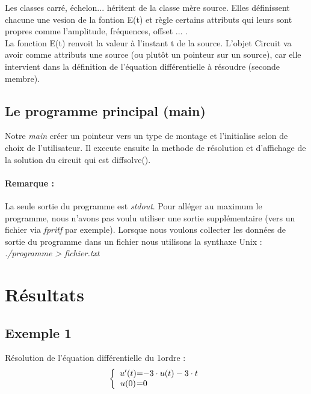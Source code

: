 \documentclass[a4paper,11pt]{article}
\begin{document}
Les classes carré, échelon... héritent de la classe mère source. Elles définissent chacune une vesion de la fontion E(t) et règle certains
attributs qui leurs sont propres comme l'amplitude, fréquences, offset ... .\\
La fonction E(t) renvoit la valeur à l'instant t de la source. L'objet Circuit va avoir comme attributs une source (ou plutôt un pointeur sur un source), 
car elle intervient dans la définition de l'équation différentielle à résoudre (seconde membre).

\subsection{Le programme principal (main)}
Notre \textit{main} créer un pointeur vers un type de montage et l'initialise selon de choix de l'utilisateur.
Il execute ensuite la methode de résolution et d'affichage de la solution du circuit qui est diffsolve().

\paragraph{Remarque : }La seule sortie du programme est \textit{stdout}. Pour alléger au maximum le programme, nous n'avons pas voulu 
utiliser une sortie supplémentaire (vers un fichier via \textit{fpritf} par exemple). Lorsque nous voulons collecter les données de sortie 
du programme dans un fichier nous utilisons la synthaxe Unix : \textit{./programme > fichier.txt}

\newpage

\section{Résultats}
  \subsection{Exemple 1}
Résolution de l'équation différentielle du 1\ier ordre :
\begin{equation*}
 \left \{
  \begin{array}{c @{=} l}
    u'(t) & -3\cdot u(t)-3\cdot t
\\
   u(0) & 0
  \end{array}
\right.
\end{equation*} 
\end{document}
